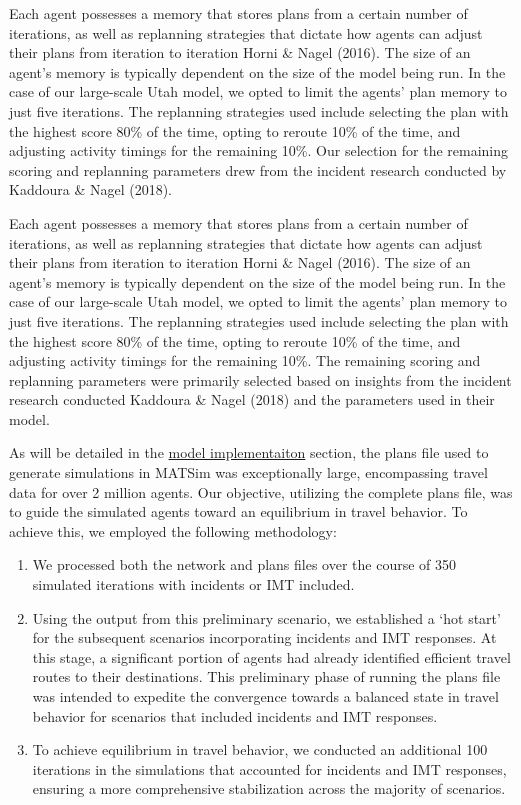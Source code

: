\documentclass[fancy, oneside, mastersfancy, ms]{byuthesis}
\providecommand{\tightlist}{%
  \setlength{\itemsep}{0pt}\setlength{\parskip}{0pt}}\usepackage{longtable,booktabs,array}
\begin{document}
Each agent possesses a memory that stores plans from a certain number of
iterations, as well as replanning strategies that dictate how agents can
adjust their plans from iteration to iteration Horni \& Nagel (2016).
The size of an agent's memory is typically dependent on the size of the
model being run. In the case of our large-scale Utah model, we opted to
limit the agents' plan memory to just five iterations. The replanning
strategies used include selecting the plan with the highest score 80\%
of the time, opting to reroute 10\% of the time, and adjusting activity
timings for the remaining 10\%. Our selection for the remaining scoring
and replanning parameters drew from the incident research conducted by
Kaddoura \& Nagel (2018).

Each agent possesses a memory that stores plans from a certain number of
iterations, as well as replanning strategies that dictate how agents can
adjust their plans from iteration to iteration Horni \& Nagel (2016).
The size of an agent's memory is typically dependent on the size of the
model being run. In the case of our large-scale Utah model, we opted to
limit the agents' plan memory to just five iterations. The replanning
strategies used include selecting the plan with the highest score 80\%
of the time, opting to reroute 10\% of the time, and adjusting activity
timings for the remaining 10\%. The remaining scoring and replanning
parameters were primarily selected based on insights from the incident
research conducted Kaddoura \& Nagel (2018) and the parameters used in
their model.

As will be detailed in the \protect\hyperlink{sec-model_imp}{model
implementaiton} section, the plans file used to generate simulations in
MATSim was exceptionally large, encompassing travel data for over 2
million agents. Our objective, utilizing the complete plans file, was to
guide the simulated agents toward an equilibrium in travel behavior. To
achieve this, we employed the following methodology:

\begin{enumerate}
\def\labelenumi{\arabic{enumi}.}
\tightlist
\item
  We processed both the network and plans files over the course of 350
  simulated iterations with incidents or IMT included.
\item
  Using the output from this preliminary scenario, we established a `hot
  start' for the subsequent scenarios incorporating incidents and IMT
  responses. At this stage, a significant portion of agents had already
  identified efficient travel routes to their destinations. This
  preliminary phase of running the plans file was intended to expedite
  the convergence towards a balanced state in travel behavior for
  scenarios that included incidents and IMT responses.
\item
  To achieve equilibrium in travel behavior, we conducted an additional
  100 iterations in the simulations that accounted for incidents and IMT
  responses, ensuring a more comprehensive stabilization across the
  majority of scenarios.
\end{enumerate}
\end{document}
